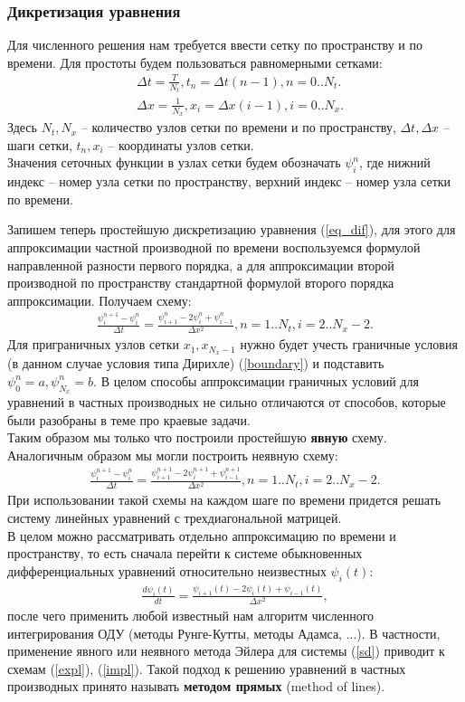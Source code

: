 \documentclass[12pt]{article}
\newcommand{\dt}{\Delta t}
\newcommand{\dx}{\Delta x}
\newcommand{\ff}[2]{{\psi_{#1}^{#2}}}
\begin{document}
\subsubsection{Дикретизация уравнения}
Для численного решения нам требуется ввести сетку по пространству и по времени. Для простоты будем пользоваться равномерными сетками:
\begin{align}
	&\dt = \frac{T}{N_t}, t_n = \dt(n-1), n=0..N_t. \\
	&\dx = \frac{1}{N_x}, x_i = \dx(i-1), i=0..N_x.
\end{align}
Здесь $N_t, N_x$ -- количество узлов сетки по времени и по пространству, $\dt, \dx$ -- шаги сетки, $t_n, x_i$ -- координаты узлов сетки. \\
Значения сеточных функции в узлах сетки будем обозначать $\psi_i^n$, где нижний индекс -- номер узла сетки по пространству, верхний индекс -- номер узла сетки по времени.


Запишем теперь простейшую дискретизацию уравнения (\ref{eq_dif}), для этого для аппроксимации частной производной по времени воспользуемся формулой направленной разности первого порядка, а для аппроксимации второй производной по пространству стандартной формулой второго порядка аппроксимации. Получаем схему:
\begin{align}\label{expl}
\frac{\ff{i}{n+1} - \ff{i}{n}}{\dt} = \frac{\ff{i+1}{n}-2\ff{i}{n}+\ff{i-1}{n}}{\dx^2}, n=1..N_t, i=2..N_x-2.
\end{align}
Для приграничных узлов сетки $x_1, x_{N_x-1}$ нужно будет учесть граничные условия (в данном случае условия типа Дирихле) (\ref{boundary}) и подставить $\psi_0^n=a, \psi_{N_x}^n=b$. В целом способы аппроксимации граничных условий для уравнений в частных производных не сильно отличаются от способов, которые были разобраны в теме про краевые задачи.\\
Таким образом мы только что построили простейшую \textbf{явную} схему. Аналогичным образом мы могли построить неявную схему:
\begin{align}\label{impl}
\frac{\ff{i}{n+1} - \ff{i}{n}}{\dt} = \frac{\ff{i+1}{n+1}-2\ff{i}{n+1}+\ff{i-1}{n+1}}{\dx^2}, n=1..N_t, i=2..N_x-2.
\end{align}
При использовании такой схемы на каждом шаге по времени придется решать систему линейных уравнений с трехдиагональной матрицей.\\
В целом можно рассматривать отдельно аппроксимацию по времени и пространству, то есть сначала перейти к системе обыкновенных дифференциальных уравнений относительно неизвестных $\psi_i(t)$:
\begin{align}\label{sd}
\frac{d \psi_i(t)}{d t} = \frac{\psi_{i+1}(t)-2\psi_i(t)+\psi_{i-1}(t)}{\dx^2},
\end{align}
после чего применить любой известный нам алгоритм численного интегрирования ОДУ (методы Рунге-Кутты, методы Адамса, ...). В частности, применение явного или неявного метода Эйлера для системы (\ref{sd}) приводит к схемам (\ref{expl}), (\ref{impl}). Такой подход к решению уравнений в частных производных принято называть \textbf{методом прямых} (method of lines).\\
\end{document}
